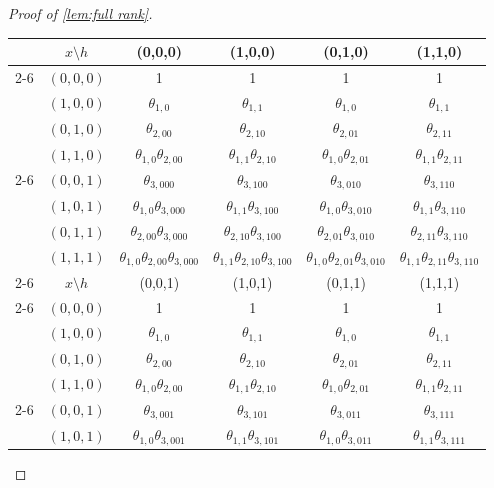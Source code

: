 \documentclass[10pt]{article} %
\begin{document}
\begin{proof}[Proof of \cref{lem:full rank}]
\begin{table}[h!]
    \centering
    \begin{tabular}{cc|cccc}
    & $x \setminus h$ & (0,0,0) & (1,0,0) & (0,1,0) & (1,1,0) \\
    \cmidrule{2-6}
    \multirow{4}{*}{$T_{00} =$} & $(0,0,0)$ & 1 & 1 & 1 & 1 \\
    & $(1,0,0)$ & $\theta_{1,0}$ & $\theta_{1,1}$ & $\theta_{1,0}$ & $\theta_{1,1}$ \\ 
    & $(0, 1, 0)$ & $\theta_{2,00}$ & $\theta_{2,10}$ & $\theta_{2,01}$ & $\theta_{2,11}$ \\ 
    & $(1,1,0)$ & $\theta_{1,0}\theta_{2,00}$ & $\theta_{1,1} \theta_{2,10}$ & $\theta_{1,0} \theta_{2,01}$ & $\theta_{1,1} \theta_{2,11}$ \\
    \cmidrule{2-6}
    \multirow{4}{*}{$T_{10} =$} & $(0, 0, 1)$ & $\theta_{3,000}$ & $\theta_{3,100}$ & $\theta_{3,010}$ & $\theta_{3,110}$ \\
    & $(1, 0, 1)$ & $\theta_{1,0} \theta_{3,000}$ & $\theta_{1,1} \theta_{3,100}$ & $\theta_{1,0} \theta_{3,010}$ & $\theta_{1,1} \theta_{3,110}$ \\
    & $(0, 1, 1)$ & $\theta_{2,00} \theta_{3,000}$ & $\theta_{2,10} \theta_{3,100}$ & $\theta_{2,01} \theta_{3,010}$ & $\theta_{2,11} \theta_{3,110}$ \\
    & $(1, 1, 1)$ & $\theta_{1,0} \theta_{2,00} \theta_{3,000}$ & $\theta_{1,1} \theta_{2,10} \theta_{3,100}$ & $\theta_{1,0} \theta_{2,01} \theta_{3,010}$ & $\theta_{1,1} \theta_{2,11} \theta_{3,110}$ \\
    \cmidrule{2-6}
    \addlinespace
    & $x \setminus h$ & (0,0,1) & (1,0,1) & (0,1,1) & (1,1,1) \\ %
    \cmidrule{2-6}
    \multirow{4}{*}{$T_{01} =$} & $(0,0,0)$ & 1 & 1 & 1 & 1 \\
    & $(1,0,0)$ & $\theta_{1,0}$ & $\theta_{1,1}$ & $\theta_{1,0}$ & $\theta_{1,1}$ \\ 
    & $(0, 1, 0)$ & $\theta_{2,00}$ & $\theta_{2,10}$ & $\theta_{2,01}$ & $\theta_{2,11}$ \\ 
    & $(1,1,0)$ & $\theta_{1,0}\theta_{2,00}$ & $\theta_{1,1} \theta_{2,10}$ & $\theta_{1,0} \theta_{2,01}$ & $\theta_{1,1} \theta_{2,11}$ \\
    \cmidrule{2-6}
    \multirow{4}{*}{$T_{11} =$} & $(0, 0, 1)$  & $\theta_{3,001}$ & $\theta_{3,101}$ & $\theta_{3,011}$ & $\theta_{3,111}$ \\
    & $(1, 0, 1)$ & $\theta_{1,0} \theta_{3,001}$ & $\theta_{1,1} \theta_{3,101}$ & $\theta_{1,0} \theta_{3,011}$ & $\theta_{1,1} \theta_{3,111}$ \\

\end{tabular}
\end{table}
\end{proof}
\end{document}
